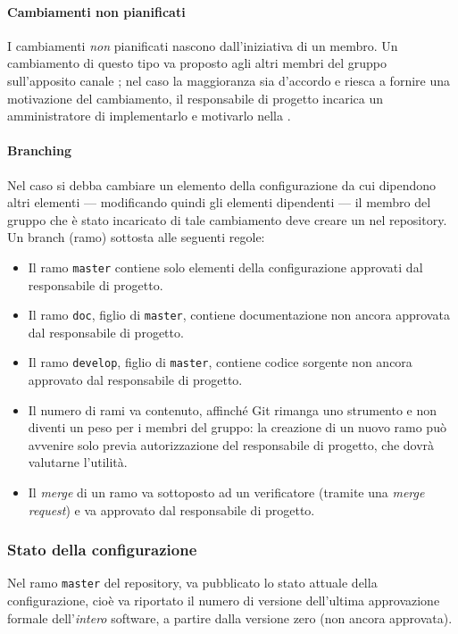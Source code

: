 \paragraph{Cambiamenti non pianificati} I cambiamenti \emph{non} pianificati nascono dall'iniziativa di un membro. Un cambiamento di questo tipo va proposto agli altri membri del gruppo sull'apposito canale ; nel caso la maggioranza sia d'accordo e riesca a fornire una motivazione del cambiamento, il responsabile di progetto incarica un amministratore di implementarlo e motivarlo nella .
\paragraph{Branching} Nel caso si debba cambiare un elemento della configurazione da cui dipendono altri elementi --- modificando quindi gli elementi dipendenti --- il membro del gruppo che è stato incaricato di tale cambiamento deve creare un  nel repository. Un branch (ramo) sottosta alle seguenti regole:
\begin{itemize}
	\item Il ramo \texttt{master} contiene solo elementi della configurazione approvati dal responsabile di progetto.
	\item Il ramo \texttt{doc}, figlio di \texttt{master}, contiene documentazione non ancora approvata dal responsabile di progetto.
	\item Il ramo \texttt{develop}, figlio di \texttt{master}, contiene codice sorgente non ancora approvato dal responsabile di progetto.
	\item Il numero di rami va contenuto, affinché Git rimanga uno strumento e non diventi un peso per i membri del gruppo: la creazione di un nuovo ramo può avvenire solo previa autorizzazione del responsabile di progetto, che dovrà valutarne l'utilità.
	\item Il \emph{merge} di un ramo va sottoposto ad un verificatore (tramite una \emph{merge request}) e va approvato dal responsabile di progetto.
\end{itemize}

\subsubsection{Stato della configurazione}
Nel ramo \texttt{master} del repository, va pubblicato lo stato attuale della configurazione, cioè va riportato il numero di versione dell'ultima approvazione formale dell'\emph{intero} software, a partire dalla versione zero (non ancora approvata).



